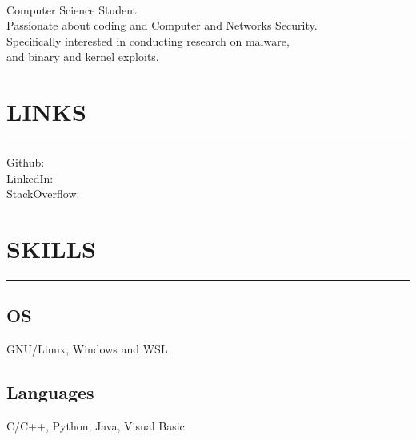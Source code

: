 \documentclass[]{resume}
\begin{document}
%
%

\begin{large}
    \\
\end{large}

\vspace{4pt}
\noindent Computer Science Student\\
Passionate about coding and Computer and Networks Security.\\
Specifically interested in conducting research on malware,\\
and binary and kernel exploits.


%
%

\section{LINKS}
\noindent\rule{5 cm}{0.4pt}

\noindent Github: \href{https://github.com/papadoxie}{}\\
LinkedIn: \href{https://linkedin.com/in/nofil-qasim}{}\\
StackOverflow: \href{https://stackoverflow.com/users/8430623/papadoxie}{}\\

%
%

\section{SKILLS}
\noindent\rule{5 cm}{0.4pt}

\subsection{OS}
\noindent GNU/Linux, Windows and WSL

\vspace{6pt}
\subsection{Languages}
\noindent C/C++, Python, Java, Visual Basic

\vspace{6pt}
\end{document}
